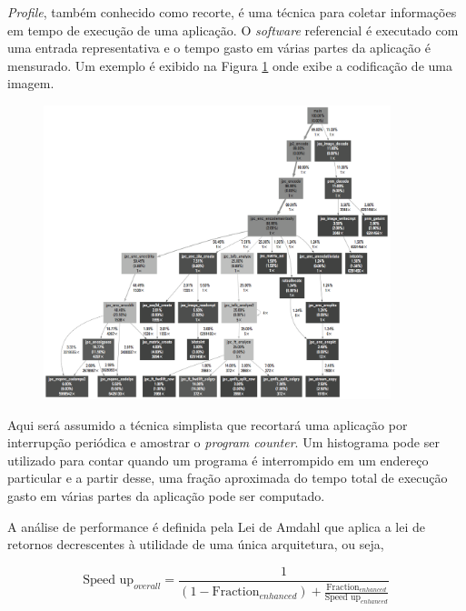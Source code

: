 \textit{Profile}, também conhecido como recorte, é uma técnica para coletar informações em tempo de execução de uma aplicação. O \textit{software} referencial é executado com uma entrada representativa e o tempo gasto em várias partes da aplicação é mensurado. Um exemplo é exibido na Figura \ref{fig:f4-1} onde exibe a codificação de uma imagem.

\begin{figure}[h] \centering
	\includegraphics[width=0.9\textwidth]{img/f4-1.png}
	\caption{}
	\label{fig:f4-1}
\end{figure}

Aqui será assumido a técnica simplista que recortará uma aplicação por interrupção periódica e amostrar o \textit{program counter}. Um histograma pode ser utilizado para contar quando um programa é interrompido em um endereço particular e a partir desse, uma fração aproximada do tempo total de execução gasto em várias partes da aplicação pode ser computado.

A análise de performance é definida pela Lei de Amdahl que aplica a lei de retornos decrescentes à utilidade de uma única arquitetura, ou seja, 



$$ \text{Speed up}_{overall} = \frac{1}{(1 - \text{Fraction}_{enhanced}) + \frac{\text{Fraction}_{enhanced}}{\text{Speed up}_{enhanced}}} $$



